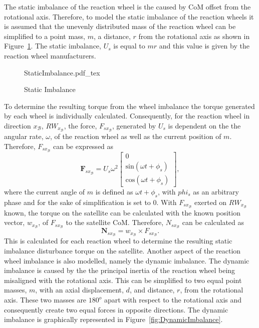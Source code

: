 The static imbalance of the reaction wheel is the caused by CoM offset from the rotational axis. Therefore, to model the static imbalance of the reaction wheels it is assumed that the unevenly distributed mass of the reaction wheel can be simplified to a point mass, $m$, a distance, $r$ from the rotational axis as shown in Figure~\ref{fig:StaticImbalance}. The static imbalance, $U_s$ is equal to $mr$ and this value is given by the reaction wheel manufacturers.
\begin{figure}[!htb]
	\centering
	\def\svgwidth{10cm}
	{StaticImbalance.pdf_tex}
	\caption{Static Imbalance}
	\label{fig:StaticImbalance}
\end{figure}
To determine the resulting torque from the wheel imbalance the torque generated by each wheel is individually calculated. Consequently, for the reaction wheel in direction $x_\mathcal{B}$, $RW_{x_\mathcal{B}}$, the force, $F_{sx_\mathcal{B}}$, generated by $U_s$ is dependent on the the angular rate, $\omega$, of the reaction wheel as well as the current position of $m$. Therefore, $F_{sx_\mathcal{B}}$ can be expressed as
\begin{equation}
\mathbf{F}_{sx_\mathcal{B}} = U_s\omega^2 \begin{bmatrix} 0 \\ \text{sin}(\omega t + \phi_s) \\ \text{cos}(\omega t + \phi_s)\end{bmatrix},
\end{equation}
where the current angle of $m$ is defined as $\omega t + \phi_s$, with $phi_s$ as an arbitrary phase and for the sake of simplification is set to $0$. With $F_{sx_\mathcal{B}}$ exerted on $RW_{x_\mathcal{B}}$ known, the torque on the satellite can be calculated with the known position vector, $w_{x_\mathcal{B}}$, of $F_{sx_\mathcal{B}}$ to the satellite CoM. Therefore, $N_{sx_\mathcal{B}}$ can be calculated as
\begin{equation}
\mathbf{N}_{sx_\mathcal{B}} = w_{x_\mathcal{B}} \times F_{sx_\mathcal{B}}.
\end{equation}
This is calculated for each reaction wheel to determine the resulting static imbalance disturbance torque on the satellite. Another aspect of the reaction wheel imbalance is also modelled, namely the dynamic imbalance. The dynamic imbalance is caused by the the principal inertia of the reaction wheel being misaligned with the rotational axis. This can be simplified to two equal point masses, $m$, with an axial displacement, $d$, and distance, $r$, from the rotational axis. These two masses are $\num{180}^o$ apart with respect to the rotational axis and consequently create two equal forces in opposite directions. The dynamic imbalance is graphically represented in Figure~\ref{fig:DynamicImbalance}.
